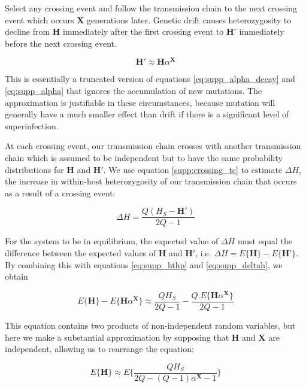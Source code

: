 \documentclass[_main.tex]{subfiles}
\begin{document}
Select any crossing event and follow the transmission chain to the next crossing event which occurs \textbf{X} generations later. Genetic drift causes heterozygosity to decline from $\mathbf{H}$ immediately after the first crossing event to $\mathbf{H'}$ immediately before the next crossing event. 

\begin{equation}
\mathbf{H'} \approx \mathbf{H} \alpha^{\textbf{X}}
\label{eq:supp_hthp}
\end{equation}

This is essentially a truncated version of equations \ref{eq:supp_alpha_decay} and \ref{eq:supp_alpha} that ignores the accumulation of new mutations.  The approximation is justifiable in these circumstances, because mutation will generally have a much smaller effect than drift if there is a significant level of superinfection.

At each crossing event, our transmission chain crosses with another transmission chain which is assumed to be independent but to have the same probability distributions for $\mathbf{H}$ and $\mathbf{H'}$.  We use equation \ref{supp:crossing_tc} to estimate $\Delta H$, the increase in within-host heterozygosity of our transmission chain that occurs as a result of a crossing event:

\begin{equation}
\Delta H = \frac{Q (H_S  - \mathbf{H'})}{2Q-1}
\label{eq:supp_deltah}
\end{equation}

For the system to be in equilibrium, the expected value of $\Delta H$ must equal the difference between the expected values of $\mathbf{H}$ and $\mathbf{H'}$, i.e. $\Delta H = E \{ \textbf{H} \} - E \{ \textbf{H'} \}$. By combining this with equations \ref{eq:supp_hthp} and \ref{eq:supp_deltah}, we obtain

\begin{equation}
E \{ \textbf{H} \} - E \{ \textbf{H} \alpha^{\textbf{X}} \} 
\approx
\frac{Q H_S }{2Q-1} - \frac{ Q. E \{ \textbf{H} \alpha^\textbf{X} \} }{2Q-1}
\label{eq:supp_eval_eh}
\end{equation}

This equation contains two products of non-independent random variables, but here we make a substantial approximation by supposing that $\textbf{H}$ and $\textbf{X}$ are independent, allowing us to rearrange the equation:

\begin{equation*}
E \{  \textbf{H} \}  
\approx 
E \Big\{ \frac{Q H_S}{2Q - (Q -1)\alpha^\textbf{X} - 1} \Big\}
\end{equation*}
\end{document}
